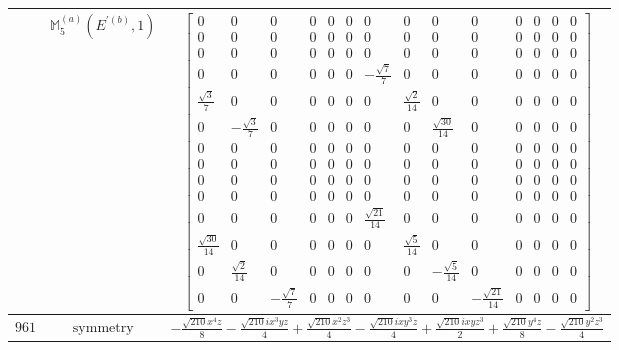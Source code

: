 \documentclass[fleqn,8pt,landscape]{jsarticle}
\begin{document}
\begin{longtable}{ccc}
$  $ & $ \mathbb{M}_{5}^{(a)}(E^{\prime(b)},1) $ & $ \begin{bmatrix} 0 & 0 & 0 & 0 & 0 & 0 & 0 & 0 & 0 & 0 & 0 & 0 & 0 & 0 \\ 0 & 0 & 0 & 0 & 0 & 0 & 0 & 0 & 0 & 0 & 0 & 0 & 0 & 0 \\ 0 & 0 & 0 & 0 & 0 & 0 & 0 & 0 & 0 & 0 & 0 & 0 & 0 & 0 \\ 0 & 0 & 0 & 0 & 0 & 0 & - \frac{\sqrt{7}}{7} & 0 & 0 & 0 & 0 & 0 & 0 & 0 \\ \frac{\sqrt{3}}{7} & 0 & 0 & 0 & 0 & 0 & 0 & \frac{\sqrt{2}}{14} & 0 & 0 & 0 & 0 & 0 & 0 \\ 0 & - \frac{\sqrt{3}}{7} & 0 & 0 & 0 & 0 & 0 & 0 & \frac{\sqrt{30}}{14} & 0 & 0 & 0 & 0 & 0 \\ 0 & 0 & 0 & 0 & 0 & 0 & 0 & 0 & 0 & 0 & 0 & 0 & 0 & 0 \\ 0 & 0 & 0 & 0 & 0 & 0 & 0 & 0 & 0 & 0 & 0 & 0 & 0 & 0 \\ 0 & 0 & 0 & 0 & 0 & 0 & 0 & 0 & 0 & 0 & 0 & 0 & 0 & 0 \\ 0 & 0 & 0 & 0 & 0 & 0 & 0 & 0 & 0 & 0 & 0 & 0 & 0 & 0 \\ 0 & 0 & 0 & 0 & 0 & 0 & \frac{\sqrt{21}}{14} & 0 & 0 & 0 & 0 & 0 & 0 & 0 \\ \frac{\sqrt{30}}{14} & 0 & 0 & 0 & 0 & 0 & 0 & \frac{\sqrt{5}}{14} & 0 & 0 & 0 & 0 & 0 & 0 \\ 0 & \frac{\sqrt{2}}{14} & 0 & 0 & 0 & 0 & 0 & 0 & - \frac{\sqrt{5}}{14} & 0 & 0 & 0 & 0 & 0 \\ 0 & 0 & - \frac{\sqrt{7}}{7} & 0 & 0 & 0 & 0 & 0 & 0 & - \frac{\sqrt{21}}{14} & 0 & 0 & 0 & 0 \end{bmatrix} $ \\ \hline
$ 961 $ & $ \text{symmetry} $ & $ - \frac{\sqrt{210} x^{4} z}{8} - \frac{\sqrt{210} i x^{3} y z}{4} + \frac{\sqrt{210} x^{2} z^{3}}{4} - \frac{\sqrt{210} i x y^{3} z}{4} + \frac{\sqrt{210} i x y z^{3}}{2} + \frac{\sqrt{210} y^{4} z}{8} - \frac{\sqrt{210} y^{2} z^{3}}{4} $ \\

\end{longtable}
\end{document}
